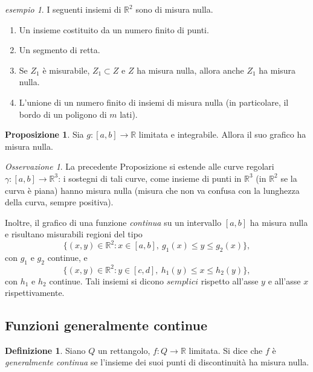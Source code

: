 \documentclass[a4paper]{book}
\numberwithin{equation}{section}
\theoremstyle{plain}
\theoremstyle{definition}
\newtheorem{defn}{Definizione}[section]
\newtheorem{prop}{Proposizione}[section]
\theoremstyle{remark}
\newtheorem{oss}{Osservazione}[section]
\theoremstyle{example}
\newtheorem{exmp}{esempio}[section]
\begin{document}
\begin{exmp}
	I seguenti insiemi di $\mathbb{R}^2$ sono di misura nulla.
	\begin{enumerate}
		\item Un insieme costituito da un numero finito di punti.
		\item Un segmento di retta.
		\item Se $Z_1$ è misurabile, $Z_1 \subset Z$ e $Z$ ha misura nulla, allora anche $Z_1$ ha misura nulla.
		\item L'unione di un numero finito di insiemi di misura nulla (in particolare, il bordo di un poligono di $m$ lati).
	\end{enumerate}
\end{exmp}

\begin{prop}
	Sia $g \colon [a, b] \to \mathbb{R}$ limitata e integrabile. Allora il suo grafico ha misura nulla.
\end{prop}

\begin{oss}
	La precedente Proposizione si estende alle curve regolari $\gamma \colon [a, b] \to \mathbb{R}^3$: i sostegni di tali curve, come insieme di punti in $\mathbb{R}^3$ (in $\mathbb{R}^2$ se la curva è piana) hanno misura nulla (misura che non va confusa con la lunghezza della curva, sempre positiva).
\end{oss}

Inoltre, il grafico di una funzione \emph{continua} su un intervallo $[a, b]$ ha misura nulla e risultano misurabili regioni del tipo
\begin{equation}
	\{(x,y) \in \mathbb{R}^2  \colon x \in [a, b], \ g_1 (x) \le y \le g_2(x)\},
\end{equation}
con $g_1$ e $g_2$ continue, e
\begin{equation}
	\{(x,y) \in \mathbb{R}^2 \colon y \in [c,d], \ h_1(y) \le x \le h_2(y) \},
\end{equation}
con $h_1$ e $h_2$ continue. Tali insiemi si dicono $semplici$ rispetto all'asse $y$ e all'asse $x$ rispettivamente.

\subsection{Funzioni generalmente continue}
\begin{defn}
	Siano $Q$ un rettangolo, $f \colon Q \to \mathbb{R}$ limitata. Si dice che $f$ è \emph{generalmente continua} se l'insieme dei suoi punti di discontinuità ha misura nulla.
\end{defn}
\end{document}
